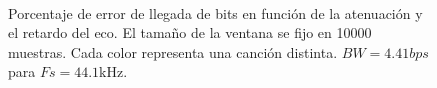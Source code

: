 \documentclass[conference]{IEEEtran}
\begin{document}
\begin{figure}[h]
    \centering
\\
 
  \caption{Porcentaje de error de llegada de bits en función de la atenuación y el retardo del eco. El tamaño de la ventana se fijo en 10000 muestras. Cada color representa una canción distinta. $BW=4.41bps$ para $Fs=44.1$kHz.}
  \label{fig:10000} 
\end{figure}
\end{document}
